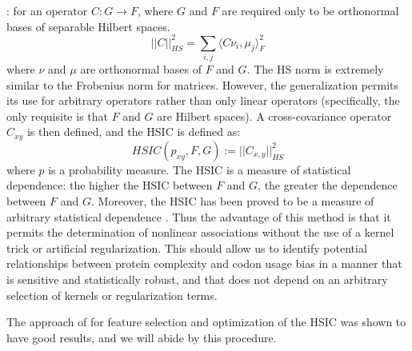 \documentclass[11pt]{nih}
\begin{document}
\begin{enumerate}
: for an operator $C: G \rightarrow F$, where $G$ and $F$ are required only to be orthonormal bases of separable Hilbert spaces.
\begin{equation}
||C||_{HS}^2 = \displaystyle \sum_{i,j} \langle C \nu_i, \mu_j \rangle_F^2
\end{equation}
where $\nu$ and $\mu$ are orthonormal bases of $F$ and $G$. The HS norm is extremely similar to the Frobenius norm for matrices. However, the generalization permits its use for arbitrary operators rather than only linear operators (specifically, the only requisite is that $F$ and $G$ are Hilbert spaces).
A cross-covariance operator $C_{xy}$ is then defined, and the HSIC is defined as:
\begin{equation}
HSIC(p_{xy}, F, G) := ||C_{x,y}||_{HS}^2
\end{equation}
where $p$ is a probability measure.
\cite{Song2012}
The HSIC is a measure of statistical dependence: the higher the HSIC between $F$ and $G$, the greater the dependence between $F$ and $G$. Moreover, the HSIC has been proved to be a measure of arbitrary statistical dependence \citet{Song2012a}. Thus the advantage of this method is that it permits the determination of nonlinear associations without the use of a kernel trick or artificial regularization. This should allow us to identify potential relationships between protein complexity and codon usage bias in a manner that is sensitive and statistically robust, and that does not depend on an arbitrary selection of kernels or regularization terms.

The approach of \citet{Song2012a} for feature selection and optimization of the HSIC was shown to have good results, and we will abide by this procedure.




\end{enumerate}


\end{document}
